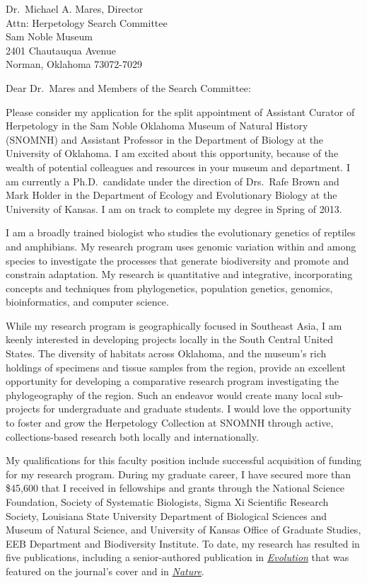 \documentclass[letterpaper, 10pt]{letter}
\begin{document}
\begin{letter}{Dr.\ Michael A. Mares, Director \\
                     Attn: Herpetology Search Committee \\
                     Sam Noble Museum \\
                     2401 Chautauqua Avenue \\
                     Norman, Oklahoma 73072-7029}
\opening{Dear Dr.\ Mares and Members of the Search Committee:}
\raggedright
Please consider my application for the split appointment of Assistant Curator
of Herpetology in the Sam Noble Oklahoma Museum of Natural History (SNOMNH) and
Assistant Professor in the Department of Biology at the University of Oklahoma.
I am excited about this opportunity, because of the wealth of potential
colleagues and resources in your museum and department.
I am currently a Ph.D.\ candidate under the direction of Drs.\ Rafe Brown and
Mark Holder in the Department of Ecology and Evolutionary Biology at the
University of Kansas.
I am on track to complete my degree in Spring of 2013.

I am a broadly trained biologist who studies the evolutionary genetics of
reptiles and amphibians.
My research program uses genomic variation within and among species to
investigate the processes that generate biodiversity and promote and constrain
adaptation.
My research is quantitative and integrative, incorporating concepts and
techniques from phylogenetics, population genetics, genomics, bioinformatics,
and computer science.

While my research program is geographically focused in Southeast Asia, I am
keenly interested in developing projects locally in the South Central United
States.
The diversity of habitats across Oklahoma, and the museum's rich holdings of
specimens and tissue samples from the region, provide an excellent opportunity
for developing a comparative research program investigating the phylogeography
of the region.
Such an endeavor would create many local sub-projects for undergraduate and
graduate students.
I would love the opportunity to foster and grow the Herpetology Collection at
SNOMNH through active, collections-based research both locally and
internationally.

My qualifications for this faculty position include successful acquisition of
funding for my research program.
During my graduate career, I have secured more than \$45,600 that I received in
fellowships and grants through the 
National Science Foundation,
Society of Systematic Biologists,
Sigma Xi Scientific Research Society,
Louisiana State University Department of Biological Sciences and Museum of
Natural Science,
and University of Kansas Office of Graduate Studies, EEB Department and
Biodiversity Institute.
To date, my research has resulted in five publications, including a
senior-authored publication in
\href{http://onlinelibrary.wiley.com/doi/10.1111/j.1558-5646.2011.01373.x/abstract}{\it
Evolution} that was featured on the journal's cover and in
\href{http://www.nature.com/nature/journal/v474/n7353/full/474545a.html}{\it
Nature}. 


\end{letter}
\end{document}
